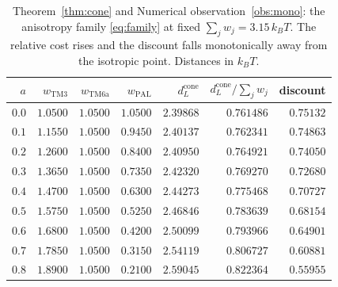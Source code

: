 \documentclass[11pt,reqno]{amsart}
\theoremstyle{plain}
\theoremstyle{definition}
\theoremstyle{remark}
\numberwithin{equation}{section}
\newcommand{\dcone}{d_L^{\mathrm{cone}}}
\newcommand{\kT}{k_{B}T}
\begin{document}
\begin{table}[ht]
\centering\small\setlength{\tabcolsep}{5pt}
\caption{Theorem~\ref{thm:cone} and Numerical observation~\ref{obs:mono}: the anisotropy family \eqref{eq:family} at fixed $\sum_jw_j=3.15\,\kT$. The relative cost rises and the discount falls monotonically away from the isotropic point. Distances in $\kT$.}
\label{tab:cone}
\begin{tabular}{@{}r r r r r r r@{}}
\toprule
$a$ & $w_{\mathrm{TM3}}$ & $w_{\mathrm{TM6a}}$ & $w_{\mathrm{PAL}}$ & $\dcone$ & $\dcone/\sum_jw_j$ & discount \\
\midrule
$0.0$ & $1.0500$ & $1.0500$ & $1.0500$ & $2.39868$ & $0.761486$ & $0.75132$ \\
$0.1$ & $1.1550$ & $1.0500$ & $0.9450$ & $2.40137$ & $0.762341$ & $0.74863$ \\
$0.2$ & $1.2600$ & $1.0500$ & $0.8400$ & $2.40950$ & $0.764921$ & $0.74050$ \\
$0.3$ & $1.3650$ & $1.0500$ & $0.7350$ & $2.42320$ & $0.769270$ & $0.72680$ \\
$0.4$ & $1.4700$ & $1.0500$ & $0.6300$ & $2.44273$ & $0.775468$ & $0.70727$ \\
$0.5$ & $1.5750$ & $1.0500$ & $0.5250$ & $2.46846$ & $0.783639$ & $0.68154$ \\
$0.6$ & $1.6800$ & $1.0500$ & $0.4200$ & $2.50099$ & $0.793966$ & $0.64901$ \\
$0.7$ & $1.7850$ & $1.0500$ & $0.3150$ & $2.54119$ & $0.806727$ & $0.60881$ \\
$0.8$ & $1.8900$ & $1.0500$ & $0.2100$ & $2.59045$ & $0.822364$ & $0.55955$ \\
\bottomrule
\end{tabular}
\end{table}
\end{document}
